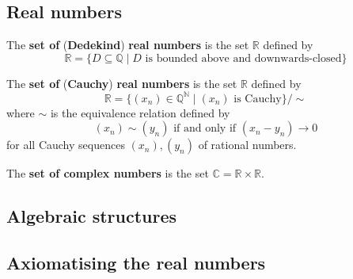 
\subsection*{Real numbers}

\todo{}

\begin{definition}
\label{defDedekindReals}
The \textbf{set of} (\textbf{Dedekind}) \textbf{real numbers} is the set $\mathbb{R}$ defined by
\[ \mathbb{R} = \{ D \subseteq \mathbb{Q} \mid D \text{ is bounded above and downwards-closed} \} \]
\end{definition}



\begin{definition}
The \textbf{set of} (\textbf{Cauchy}) \textbf{real numbers} is the set $\mathbb{R}$ defined by
\[ \mathbb{R} = \{ (x_n) \in \mathbb{Q}^{\mathbb{N}} \mid (x_n) \text{ is Cauchy} \} / {\sim} \]
where $\sim$ is the equivalence relation defined by
\[ (x_n) \sim (y_n) \text{ if and only if } (x_n-y_n) \to 0 \]
for all Cauchy sequences $(x_n),(y_n)$ of rational numbers.
\end{definition}



\begin{definition}
\label{defComplexNumbersFromReals}
The \textbf{set of complex numbers} is the set $\mathbb{C} = \mathbb{R} \times \mathbb{R}$.
\end{definition}



\subsection*{Algebraic structures}


\subsection*{Axiomatising the real numbers}

\todo{}

